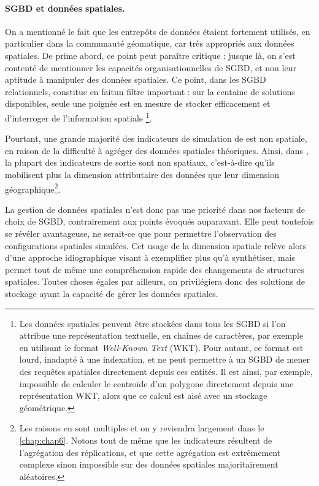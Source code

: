 \paragraph{SGBD et données spatiales.}\label{par:sgbd-spatial}

On a mentionné le fait que les entrepôts de données étaient fortement utilisés, en particulier dans la communauté géomatique, car très appropriés aux données spatiales.
De prime abord, ce point peut paraître critique : jusque là, on s'est contenté de mentionner les capacités organisationnelles de SGBD, et non leur aptitude à manipuler des données spatiales.
Ce point, dans les SGBD relationnels, constitue en faitun filtre important : sur la centaine de solutions disponibles, seule une poignée est en mesure de stocker efficacement et d'interroger de l'information spatiale \footnote{
	Les données spatiales peuvent être stockées dans tous les SGBD si l'on attribue une représentation textuelle, en chaînes de caractères, par exemple en utilisant le format \textit{Well-Known Text} (WKT).
	Pour autant, ce format est lourd, inadapté à une indexation, et ne peut permettre à un SGBD de mener des requêtes spatiales directement depuis ces entités.
	Il est ainsi, par exemple, impossible de calculer le centroïde d'un polygone directement depuis une représentation WKT, alors que ce calcul est aisé avec un stockage géométrique.
}.

Pourtant, une grande majorité des indicateurs de simulation de \simfeodal{} est non spatiale, en raison de la difficulté à agréger des données spatiales théoriques.
Ainsi, dans \simfeodal{}, la plupart des indicateurs de sortie sont non spatiaux, c'est-à-dire qu'ils mobilisent plus la dimension attributaire des données que leur dimension géographique\footnote{
	Les raisons en sont multiples et on y reviendra largement dans le \cref{chap:chap6}.
	Notons tout de même que les indicateurs résultent de l'agrégation des réplications, et que cette agrégation est extrêmement complexe sinon impossible sur des données spatiales majoritairement aléatoires.
}.

La gestion de données spatiales n'est donc pas une priorité dans nos facteurs de choix de SGBD, contrairement aux points évoqués auparavant.
Elle peut toutefois se révéler avantageuse, ne serait-ce que pour permettre l'observation des configurations spatiales simulées.
Cet usage de la dimension spatiale relève alors d'une approche idiographique visant à exemplifier plus qu'à synthétiser, mais permet tout de même une compréhension rapide des changements de structures spatiales.
Toutes choses égales par ailleurs, on privilégiera donc des solutions de stockage ayant la capacité de gérer les données spatiales.

